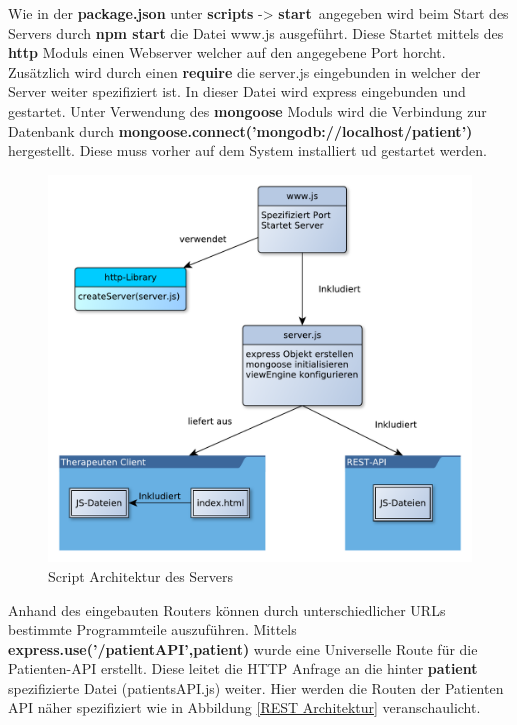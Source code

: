 Wie in der \textbf{package.json} unter \textbf{scripts} -> \textbf{start}\ angegeben wird beim Start des Servers durch \textbf{npm start} die Datei www.js ausgeführt. Diese Startet mittels des \textbf{http} Moduls einen Webserver welcher auf den angegebene Port horcht. Zusätzlich wird durch einen \textbf{require} die server.js eingebunden in welcher der Server weiter spezifiziert ist. In dieser Datei wird express eingebunden und gestartet. Unter Verwendung des \textbf{mongoose} Moduls wird die Verbindung zur Datenbank durch \textbf{mongoose.connect('mongodb://localhost/patient')} hergestellt. Diese muss vorher auf dem System installiert ud gestartet werden.
\begin{figure}[H]
	\centering
	\includegraphics[scale=0.74]{images/ServerScriptArchitektur}
	\caption[Script Architektur des Servers]{Script Architektur des Servers}
	\label{ServerScriptArchitektur}
\end{figure}
Anhand des eingebauten Routers können durch unterschiedlicher URLs bestimmte Programmteile auszuführen. Mittels \textbf{express.use('/patientAPI',patient)} wurde eine Universelle Route für die Patienten-API erstellt. Diese leitet die HTTP Anfrage an die hinter \textbf{patient} spezifizierte Datei (patientsAPI.js) weiter. Hier werden die Routen der Patienten API näher spezifiziert wie in Abbildung \ref{REST Architektur} veranschaulicht.
